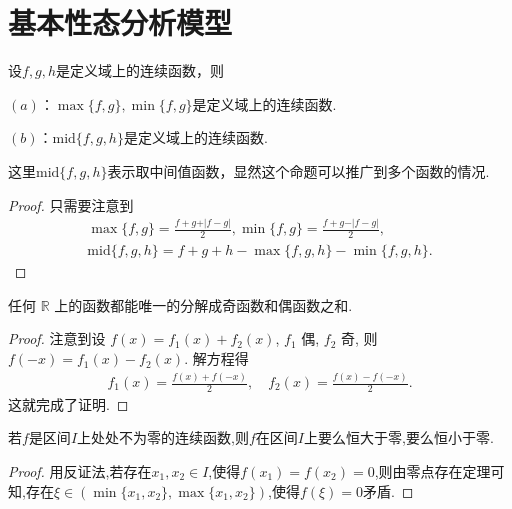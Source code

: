 \documentclass[../../main.tex]{subfiles}%
\begin{document}
\section{基本性态分析模型}

\begin{proposition}[多个函数取最值或者中间值]\label{proposition:多个函数取最值或者中间值}
设\(f,g,h\)是定义域上的连续函数，则

\((a)\)：\(\max\{f,g\}, \min\{f,g\}\)是定义域上的连续函数.

\((b)\)：\(\text{mid}\{f,g,h\}\)是定义域上的连续函数.
\end{proposition}
\begin{remark}
这里\(\text{mid}\{f,g,h\}\)表示取中间值函数，显然这个命题可以推广到多个函数的情况.
\end{remark}
\begin{proof}

只需要注意到
\begin{gather*}
\max\{f,g\}=\frac{f + g+\vert f - g\vert}{2},
\min\{f,g\}=\frac{f + g-\vert f - g\vert}{2},\\
\text{mid}\{f,g,h\}=f + g + h-\max\{f,g,h\}-\min\{f,g,h\}.
\end{gather*}

\end{proof}

\begin{lemma}\label{lemma:函数的奇偶函数分解}
任何 $\mathbb{R}$ 上的函数都能唯一的分解成奇函数和偶函数之和.
\end{lemma}
\begin{proof}

注意到设 $f(x) = f_1(x) + f_2(x)$, $f_1$ 偶, $f_2$ 奇, 则 $f(-x) = f_1(x) - f_2(x)$. 解方程得
\begin{align*}
f_1(x) = \frac{f(x) + f(-x)}{2}, \quad f_2(x) = \frac{f(x) - f(-x)}{2}.
\end{align*}
这就完成了证明.

\end{proof}

\begin{proposition}\label{proposition:连续函数无零点则一定恒大于零或恒小于零}
若\(f\)是区间\(I\)上处处不为零的连续函数,则\(f\)在区间\(I\)上要么恒大于零,要么恒小于零.
\end{proposition}
\begin{proof}

用反证法,若存在$x_1,x_2\in I$,使得$f(x_1)=f(x_2)=0$,则由零点存在定理可知,存在$\xi \in (\min\{x_1,x_2\},\max\{x_1,x_2\})$,使得$f(\xi)=0$矛盾.

\end{proof}
\end{document}
